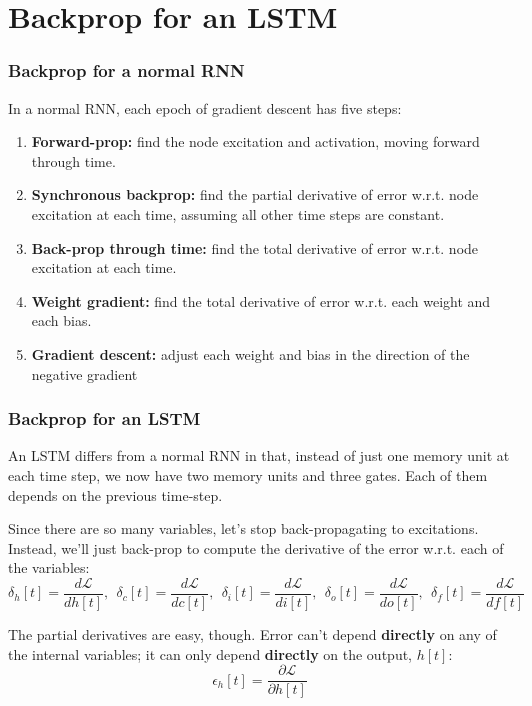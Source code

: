 \documentclass{beamer}
\begin{document}
\section[Backprop]{Backprop for an LSTM}
\setcounter{subsection}{1}

\begin{frame}
  \frametitle{Backprop for a normal RNN}
  In a normal RNN, each epoch of gradient descent has five steps:
  \begin{enumerate}
    \item {\bf Forward-prop:} find the node excitation and activation,
      moving forward through time.
    \item {\bf Synchronous backprop:} find the partial derivative of
      error w.r.t. node excitation at each time, assuming all other
      time steps are constant.
    \item {\bf Back-prop through time:} find the total derivative of
      error w.r.t. node excitation at each time.
    \item {\bf Weight gradient:} find the total derivative of error
      w.r.t. each weight and each bias.
    \item {\bf Gradient descent:} adjust each weight and bias in the direction
      of the negative gradient
  \end{enumerate}
\end{frame}

\begin{frame}
  \frametitle{Backprop for an LSTM}

  An LSTM differs from a normal RNN in that, instead of just one
  memory unit at each time step, we now have two memory units and
  three gates.  Each of them depends on the previous time-step.

  Since there are so many variables, let's stop back-propagating to
  excitations.  Instead, we'll just back-prop to compute the
  derivative of the error w.r.t. each of the variables:
  \[\delta_h[t]=\frac{d{\mathcal L}}{dh[t]},~~\delta_c[t]=\frac{d{\mathcal L}}{dc[t]},~~
  \delta_i[t]=\frac{d{\mathcal L}}{di[t]},~~\delta_o[t]=\frac{d{\mathcal L}}{do[t]},~~\delta_f[t]=\frac{d{\mathcal L}}{df[t]}\]

  The partial derivatives are easy, though.  Error can't depend {\bf
    directly} on any of the internal variables; it can only depend
  {\bf directly} on the output, $h[t]$:
  \[\epsilon_h[t]=\frac{\partial {\mathcal L}}{\partial h[t]}\]
\end{frame}
  
\end{document}

